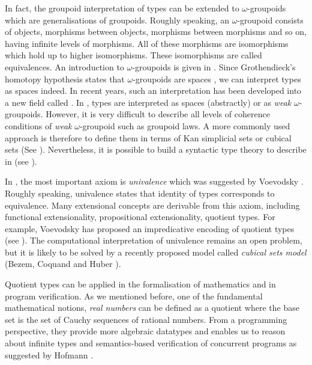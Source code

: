 In fact, the groupoid interpretation of types can be extended to
$\omega$-groupoids which are generalisations of groupoids. Roughly
speaking, an $\omega$-groupoid consists of objects, morphisms between
objects, morphisms between morphisms and so on, having infinite levels
of morphisms. All of these morphisms are isomorphisms which hold up to
higher isomorphisms. These isomorphisms are called equivalences. An
introduction to $\omega$-groupoids is given in .  Since
Grothendieck's homotopy hypothesis states that $\omega$-groupoids are
spaces \cite{homotopyhyp}, we can interpret types as spaces indeed. In
recent years, such an interpretation has been developed into a new
field called \hott. In \hott, types are interpreted as spaces
(abstractly) or as \emph{weak} $\omega$-groupoids. However, it is very
difficult to describe all levels of coherence conditions of
\emph{weak} $\omega$-groupoid such as groupoid laws. A more commonly
used approach is therefore to define them in terms of Kan simplicial
sets or cubical sets (See ).  Nevertheless, it is
possible to build a syntactic type theory to describe \wog in \itt
(see ).


In \hott, the most important axiom is \emph{univalence} which was
suggested by Voevodsky \cite{VV}. Roughly speaking, univalence states
that identity of types corresponds to equivalence. Many extensional
concepts are derivable from this axiom, including functional
extensionality, propositional extensionality, quotient types. For
example, Voevodsky has proposed an impredicative encoding of quotient
types (see ). The computational interpretation of
univalence remains an open problem, but it is likely to be solved by a
recently proposed model called \emph{cubical sets model} (Bezem,
Coquand and Huber \cite{bezem2013model}).


Quotient types can be applied in the formalisation of mathematics and
in program verification. As we mentioned before, one of the
fundamental mathematical notions, \emph{real numbers} can be defined
as a quotient where the base set is the set of Cauchy sequences of
rational numbers. From a programming perspective, they provide more
algebraic datatypes and enables us to reason about infinite types and
semantics-based verification of concurrent programs as suggested by
Hofmann \cite{hof:phd}.


